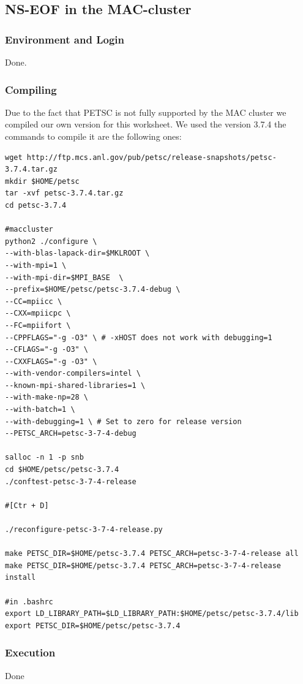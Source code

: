 \documentclass[a4paper]{article}
\begin{document}
\subsection{NS-EOF in the MAC-cluster}
\subsubsection{Environment and Login}
Done.
\subsubsection{Compiling}
Due to the fact that PETSC is not fully supported by the MAC cluster we compiled our own version for this worksheet. We used the version 3.7.4 the commands to compile it are the following ones:
\begin{lstlisting}[caption=Debug version]
wget http://ftp.mcs.anl.gov/pub/petsc/release-snapshots/petsc-3.7.4.tar.gz
mkdir $HOME/petsc
tar -xvf petsc-3.7.4.tar.gz
cd petsc-3.7.4

#maccluster
python2 ./configure \
--with-blas-lapack-dir=$MKLROOT \
--with-mpi=1 \
--with-mpi-dir=$MPI_BASE  \
--prefix=$HOME/petsc/petsc-3.7.4-debug \
--CC=mpiicc \
--CXX=mpiicpc \
--FC=mpiifort \
--CPPFLAGS="-g -O3" \ # -xHOST does not work with debugging=1
--CFLAGS="-g -O3" \
--CXXFLAGS="-g -O3" \
--with-vendor-compilers=intel \
--known-mpi-shared-libraries=1 \
--with-make-np=28 \
--with-batch=1 \
--with-debugging=1 \ # Set to zero for release version
--PETSC_ARCH=petsc-3-7-4-debug

salloc -n 1 -p snb
cd $HOME/petsc/petsc-3.7.4
./conftest-petsc-3-7-4-release

#[Ctr + D]

./reconfigure-petsc-3-7-4-release.py

make PETSC_DIR=$HOME/petsc-3.7.4 PETSC_ARCH=petsc-3-7-4-release all
make PETSC_DIR=$HOME/petsc-3.7.4 PETSC_ARCH=petsc-3-7-4-release install

#in .bashrc
export LD_LIBRARY_PATH=$LD_LIBRARY_PATH:$HOME/petsc/petsc-3.7.4/lib
export PETSC_DIR=$HOME/petsc/petsc-3.7.4
\end{lstlisting}





\subsubsection{Execution}
Done
\end{document}
